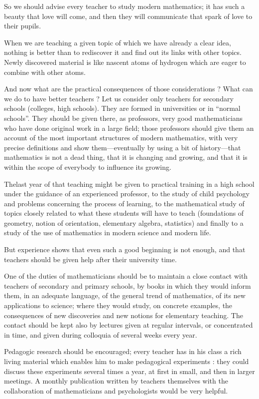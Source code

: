 So we should advise every teacher to study modern mathematics; it has such a beauty that love will come, and then they will communicate that spark of love to their pupils.

When we are teaching a given topic of which we have already a clear idea, nothing is better than to rediscover it and find out its links with other topics. Newly discovered material is like nascent atoms of hydrogen which are eager to combine with other atoms.

And now what are the practical consequences of those considerations ? What can we do to have better teachers ? Let us consider only teachers for secondary schools (colleges, high schools). They are formed in universities or in ``normal schools''. They should be given there, as professors, very good mathematicians who have done original work in a large field; those professors should give them an account of the most important structures of modern mathematics, with very precise definitions and show them---eventually by using a bit of history---that mathematics is not a dead thing, that it is changing and growing, and that it is within the scope of everybody to influence its growing.

The\pageoriginale last year of that teaching might be given to practical training in a high school under the guidance of an experienced professor, to the study of child psychology and problems concerning the process of learning, to the mathematical study of topics closely related to what these students will have to teach (foundations of geometry, notion of orientation, elementary algebra, statistics) and finally to a study of the use of mathematics in modern science and modern life.

But experience shows that even such a good beginning is not enough, and that teachers should be given help after their university time.

One of the duties of mathematicians should be to maintain a close contact with teachers of secondary and primary schools, by books in which they would inform them, in an adequate language, of the general trend of mathematics, of its new applications to science; where they would study, on concrete examples, the consequences of new discoveries and new notions for elementary teaching. The contact should be kept also by lectures given at regular intervals, or concentrated in time, and given during colloquia of several weeks every year.

Pedagogic research should be encouraged; every teacher has in his class a rich living material which enables him to make pedagogical experiments : they could discuss these experiments several times a year, at first in small, and then in larger meetings. A monthly publication written by teachers themselves with the collaboration of mathematicians and psychologists would be very helpful.


